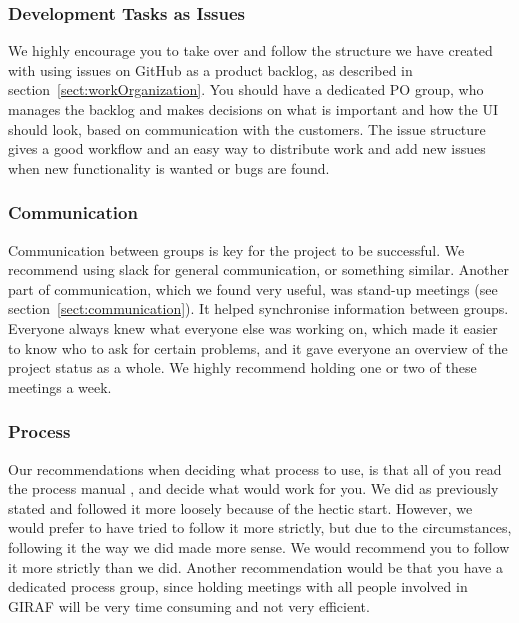 \subsubsection{Development Tasks as Issues}
We highly encourage you to take over and follow the structure we have created with using issues on GitHub as a product backlog, as described in section~\ref{sect:workOrganization}.
You should have a dedicated PO group, who manages the backlog and makes decisions on what is important and how the UI should look, based on communication with the customers.
The issue structure gives a good workflow and an easy way to distribute work and add new issues when new functionality is wanted or bugs are found.

\subsubsection{Communication}
Communication between groups is key for the project to be successful. We recommend using slack for general communication, or something similar. 
Another part of communication, which we found very useful, was stand-up meetings (see section~\ref{sect:communication}). It helped synchronise information between groups. Everyone always knew what everyone else was working on, which made it easier to know who to ask for certain problems, and it gave everyone an overview of the project status as a whole. We highly recommend holding one or two of these meetings a week. 

\subsubsection{Process}
Our recommendations when deciding what process to use, is that all of you read the process manual \citep{cite:processManualSW602F19}, and decide what would work for you. We did as previously stated and followed it more loosely because of the hectic start. However, we would prefer to have tried to follow it more strictly, but due to the circumstances, following it the way we did made more sense.
We would recommend you to follow it more strictly than we did.
Another recommendation would be that you have a dedicated process group, since holding meetings with all people involved in GIRAF will be very time consuming and not very efficient.


